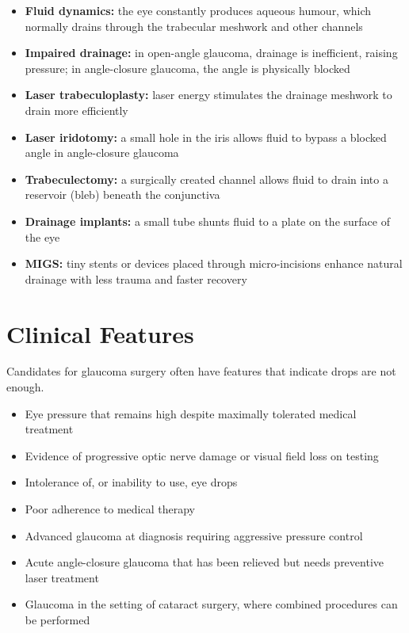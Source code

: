 \begin{itemize}
    \item \textbf{Fluid dynamics:} the eye constantly produces aqueous humour, which normally drains through the trabecular meshwork and other channels
    \item \textbf{Impaired drainage:} in open-angle glaucoma, drainage is inefficient, raising pressure; in angle-closure glaucoma, the angle is physically blocked
    \item \textbf{Laser trabeculoplasty:} laser energy stimulates the drainage meshwork to drain more efficiently
    \item \textbf{Laser iridotomy:} a small hole in the iris allows fluid to bypass a blocked angle in angle-closure glaucoma
    \item \textbf{Trabeculectomy:} a surgically created channel allows fluid to drain into a reservoir (bleb) beneath the conjunctiva
    \item \textbf{Drainage implants:} a small tube shunts fluid to a plate on the surface of the eye
    \item \textbf{MIGS:} tiny stents or devices placed through micro-incisions enhance natural drainage with less trauma and faster recovery
\end{itemize}

\section*{Clinical Features}
Candidates for glaucoma surgery often have features that indicate drops are not enough.

\begin{itemize}
    \item Eye pressure that remains high despite maximally tolerated medical treatment
    \item Evidence of progressive optic nerve damage or visual field loss on testing
    \item Intolerance of, or inability to use, eye drops
    \item Poor adherence to medical therapy
    \item Advanced glaucoma at diagnosis requiring aggressive pressure control
    \item Acute angle-closure glaucoma that has been relieved but needs preventive laser treatment
    \item Glaucoma in the setting of cataract surgery, where combined procedures can be performed
\end{itemize}

